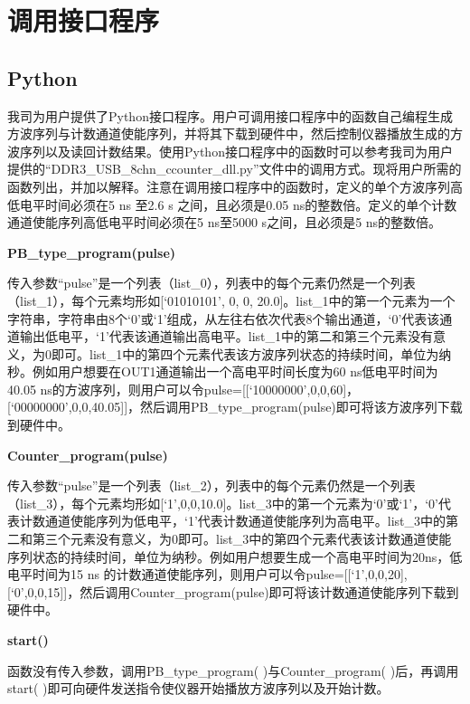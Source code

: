 \chapter{\heiti 调用接口程序}
\section{Python }
我司为用户提供了Python接口程序。用户可调用接口程序中的函数自己编程生成方波序列与计数通道使能序列，并将其下载到硬件中，然后控制仪器播放生成的方波序列以及读回计数结果。使用Python接口程序中的函数时可以参考我司为用户提供的“DDR3\_USB\_8chn\_ccounter\_dll.py”文件中的调用方式。现将用户所需的函数列出，并加以解释。注意在调用接口程序中的函数时，定义的单个方波序列高低电平时间必须在5 ns 至2.6 s 之间，且必须是0.05 ns的整数倍。定义的单个计数通道使能序列高低电平时间必须在5 ns至5000 s之间，且必须是5 ns的整数倍。
\vspace{0.4cm}

\noindent\fontsize{12pt}{\baselineskip}\textbf{PB\_type\_program(pulse)}

传入参数“pulse”是一个列表（list\_0），列表中的每个元素仍然是一个列表（list\_1），每个元素均形如[`01010101', 0, 0, 20.0]。list\_1中的第一个元素为一个字符串，字符串由8个‘0’或‘1’组成，从左往右依次代表8个输出通道，‘0’代表该通道输出低电平，‘1’代表该通道输出高电平。list\_1中的第二和第三个元素没有意义，为0即可。list\_1中的第四个元素代表该方波序列状态的持续时间，单位为纳秒。例如用户想要在OUT1通道输出一个高电平时间长度为60 ns低电平时间为40.05 ns的方波序列，则用户可以令pulse=[[`10000000',0,0,60]， [`00000000',0,0,40.05]]，然后调用PB\_type\_program(pulse)即可将该方波序列下载到硬件中。
\vspace{0.4cm}

\noindent\fontsize{12pt}{\baselineskip}\textbf{Counter\_program(pulse)}

传入参数“pulse”是一个列表（list\_2），列表中的每个元素仍然是一个列表（list\_3），每个元素均形如[`1',0,0,10.0]。list\_3中的第一个元素为‘0’或‘1’，‘0’代表计数通道使能序列为低电平，‘1’代表计数通道使能序列为高电平。list\_3中的第二和第三个元素没有意义，为0即可。list\_3中的第四个元素代表该计数通道使能序列状态的持续时间，单位为纳秒。例如用户想要生成一个高电平时间为20ns，低电平时间为15 ns 的计数通道使能序列，则用户可以令pulse=[[`1',0,0,20], [`0',0,0,15]]，然后调用Counter\_program(pulse)即可将该计数通道使能序列下载到硬件中。

\newpage
\noindent\fontsize{12pt}{\baselineskip}\textbf{start()}

函数没有传入参数，调用PB\_type\_program( )与Counter\_program( )后，再调用start( )即可向硬件发送指令使仪器开始播放方波序列以及开始计数。
\vspace{0.4cm}

